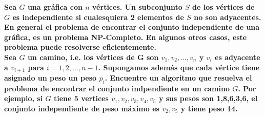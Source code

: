 \textbf{
    Sea $G$ una gráfica con $n$ vértices. Un subconjunto $S$ de los vértices de
    $G$ es independiente si cualesquiera 2 elementos de $S$ no son adyacentes.
    En general el problema de encontrar el conjunto independiente de una gráfica, 
    es un problema NP-Completo. En algunos otros casos, este problema puede resolverse
    eficientemente. \\
    Sea $G$ un camino, i.e. los vértices de G son $v_1, v_2, \ldots, v_n$ y $v_i$
    es adyacente a $v_{i+1}$ para $i = 1, 2, \ldots, n-1$. Supongamos además que cada 
    vértice tiene asignado un peso un peso $p_i$. Encuentre un algoritmo que resuelva 
    el problema de encontrar el conjunto indpendiente en un camino $G$. Por ejemplo,
    si $G$ tiene 5 vertices ${v_1, v_2, v_3, v_4, v_5}$ y sus pesos son {1,8,6,3,6},
    el conjunto independiente de peso máximo es ${v_2,v_5}$ y tiene peso 14.
}\vspace{.2cm}
\textcolor{bibi}{}
\begin{quote}
\end{quote}